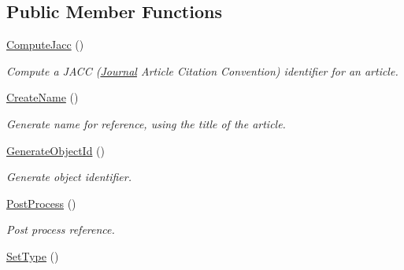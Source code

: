 \subsection*{Public Member Functions}
\begin{CompactItemize}
\item 
\hyperlink{class_reference_47df8ae6e66cda92ec9eb2ac15c075e6}{ComputeJacc} ()
\begin{CompactList}\small\item\em Compute a JACC (\hyperlink{class_journal}{Journal} Article Citation Convention) identifier for an article. \item\end{CompactList}\item 
\hypertarget{class_reference_6be437ed9ff37920ad18e121508d2f2f}{
\hyperlink{class_reference_6be437ed9ff37920ad18e121508d2f2f}{CreateName} ()}
\label{class_reference_6be437ed9ff37920ad18e121508d2f2f}

\begin{CompactList}\small\item\em Generate name for reference, using the title of the article. \item\end{CompactList}\item 
\hyperlink{class_reference_654f7079c3dca7b71d4571a0dd5891f2}{GenerateObjectId} ()
\begin{CompactList}\small\item\em Generate object identifier. \item\end{CompactList}\item 
\hyperlink{class_reference_c7779622864167fadc772a7a52d38c55}{PostProcess} ()
\begin{CompactList}\small\item\em Post process reference. \item\end{CompactList}\item 
\hypertarget{class_reference_b18ce350988efa24b4e7e9b3e58d6099}{
\hyperlink{class_reference_b18ce350988efa24b4e7e9b3e58d6099}{SetType} ()}
\label{class_reference_b18ce350988efa24b4e7e9b3e58d6099}


\end{CompactItemize}
